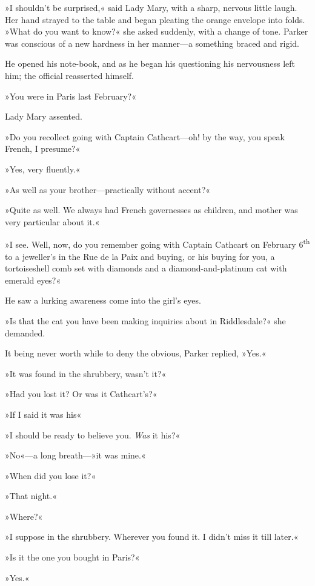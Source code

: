 »I shouldn't be surprised,« said Lady Mary, with a sharp, nervous little laugh. Her hand strayed to the table and began pleating the orange envelope into folds. »What do you want to know?« she asked suddenly, with a change of tone. Parker was conscious of a new hardness in her manner\allowbreak---\allowbreak a something braced and rigid.

He opened his note-book, and as he began his questioning his nervousness left him; the official reasserted himself.

»You were in Paris last February?«

Lady Mary assented.

»Do you recollect going with Captain Cathcart\allowbreak---\allowbreak oh! by the way, you speak French, I presume?«

»Yes, very fluently.«

»As well as your brother\allowbreak---\allowbreak practically without accent?«

»Quite as well. We always had French governesses as children, and mother was very particular about it.«

»I see. Well, now, do you remember going with Captain Cathcart on February 6\textsuperscript{th} to a jeweller's in the Rue de la Paix and buying, or his buying for you, a tortoiseshell comb set with diamonds and a diamond-and-platinum cat with emerald eyes?«

He saw a lurking awareness come into the girl's eyes.

»Is that the cat you have been making inquiries about in Riddlesdale?« she demanded.

It being never worth while to deny the obvious, Parker replied, »Yes.«

»It was found in the shrubbery, wasn't it?«

»Had you lost it? Or was it Cathcart's?«

»If I said it was his\longdash«

»I should be ready to believe you. \textit{Was} it his?«

»No«---a long breath---»it was mine.«

»When did you lose it?«

»That night.«

»Where?«

»I suppose in the shrubbery. Wherever you found it. I didn't miss it till later.«

»Is it the one you bought in Paris?«

»Yes.«

